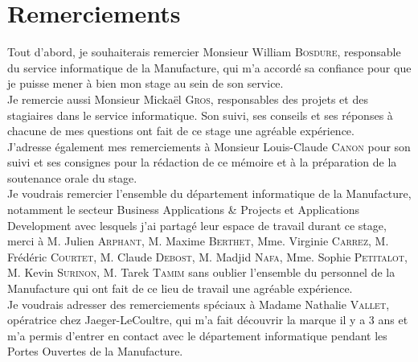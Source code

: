 \vspace*{\fill}
\section*{Remerciements}

Tout d'abord, je souhaiterais remercier Monsieur William \textsc{Bosdure}, responsable du service informatique de la Manufacture, qui m'a accordé sa confiance pour que je puisse mener à bien mon stage au sein de son service. \\

Je remercie aussi Monsieur Mickaël \textsc{Gros}, responsables des projets et des stagiaires dans le service informatique. Son suivi, ses conseils et ses réponses à chacune de mes questions ont fait de ce stage une agréable expérience. \\

J'adresse également mes remerciements à Monsieur Louis-Claude \textsc{Canon} pour son suivi et ses consignes pour la rédaction de ce mémoire et à la préparation de la soutenance orale du stage. \\

Je voudrais remercier l'ensemble du département informatique de la Manufacture, notamment le secteur Business Applications \& Projects et Applications Development avec lesquels j'ai partagé leur espace de travail durant ce stage, merci à M. Julien \textsc{Arphant}, M. Maxime \textsc{Berthet}, Mme. Virginie \textsc{Carrez}, M. Frédéric \textsc{Courtet}, M. Claude \textsc{Debost}, M. Madjid \textsc{Nafa}, Mme. Sophie \textsc{Petitalot}, M. Kevin \textsc{Surinon}, M. Tarek \textsc{Tamim} sans oublier l'ensemble du personnel de la Manufacture qui ont fait de ce lieu de travail une agréable expérience. \\

Je voudrais adresser des remerciements spéciaux à Madame Nathalie \textsc{Vallet}, opératrice chez Jaeger-LeCoultre, qui m'a fait découvrir la marque il y a 3 ans et m'a permis d'entrer en contact avec le département informatique pendant les Portes Ouvertes de la Manufacture.
\vspace*{\fill}